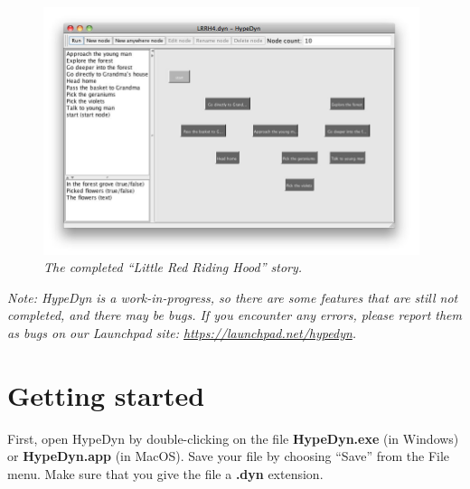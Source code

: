 \documentclass{article}
\begin{document}
\begin{figure}[h]
  \centering
  \includegraphics[width=11cm]{images/hypedyn-tutorial-3-figure-1}
  \caption{\textit{The completed ``Little Red Riding Hood'' story.}}
  \label{fig:tut3:completed}
\end{figure} 

\textit{Note:  HypeDyn is a work-in-progress, so there are some features that are still
not completed, and there may be bugs. If you encounter any errors, please
report them as bugs on our Launchpad site: \url{https://launchpad.net/hypedyn}.}

\section{Getting started}


First, open HypeDyn by double-clicking on the file \textbf{HypeDyn.exe} (in
Windows) or \textbf{HypeDyn.app} (in MacOS). Save your file by choosing ``Save''
from the File menu. Make sure that you give the file a \textbf{.dyn} extension.
\end{document}
